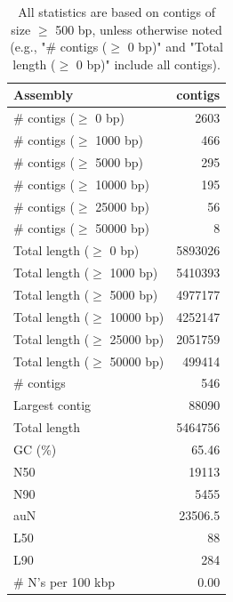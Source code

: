 \documentclass[12pt,a4paper]{article}
\begin{document}
\begin{table}[ht]
\begin{center}
\caption{All statistics are based on contigs of size $\geq$ 500 bp, unless otherwise noted (e.g., "\# contigs ($\geq$ 0 bp)" and "Total length ($\geq$ 0 bp)" include all contigs).}
\begin{tabular}{|l*{1}{|r}|}
\hline
Assembly & contigs \\ \hline
\# contigs ($\geq$ 0 bp) & 2603 \\ \hline
\# contigs ($\geq$ 1000 bp) & 466 \\ \hline
\# contigs ($\geq$ 5000 bp) & 295 \\ \hline
\# contigs ($\geq$ 10000 bp) & 195 \\ \hline
\# contigs ($\geq$ 25000 bp) & 56 \\ \hline
\# contigs ($\geq$ 50000 bp) & 8 \\ \hline
Total length ($\geq$ 0 bp) & 5893026 \\ \hline
Total length ($\geq$ 1000 bp) & 5410393 \\ \hline
Total length ($\geq$ 5000 bp) & 4977177 \\ \hline
Total length ($\geq$ 10000 bp) & 4252147 \\ \hline
Total length ($\geq$ 25000 bp) & 2051759 \\ \hline
Total length ($\geq$ 50000 bp) & 499414 \\ \hline
\# contigs & 546 \\ \hline
Largest contig & 88090 \\ \hline
Total length & 5464756 \\ \hline
GC (\%) & 65.46 \\ \hline
N50 & 19113 \\ \hline
N90 & 5455 \\ \hline
auN & 23506.5 \\ \hline
L50 & 88 \\ \hline
L90 & 284 \\ \hline
\# N's per 100 kbp & 0.00 \\ \hline
\end{tabular}
\end{center}
\end{table}
\end{document}
